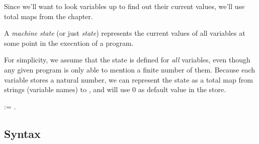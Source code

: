 \documentclass[12pt]{report}
\begin{document}
 Since we'll want to look variables up to find out their current
    values, we'll use total maps from the  chapter.


    A \textit{machine state} (or just \textit{state}) represents the current values
    of all variables at some point in the execution of a program. 

 For simplicity, we assume that the state is defined for
    \textit{all} variables, even though any given program is only able to
    mention a finite number of them.  Because each variable stores a
    natural number, we can represent the state as a total map from
    strings (variable names) to , and will use 0 as default
    value in the store. 
\begin{coqdoccode}
\coqdocemptyline
\coqdocnoindent
{}  :=  .\coqdoceol
\coqdocemptyline
\end{coqdoccode}
\subsection{Syntax}
\end{document}
